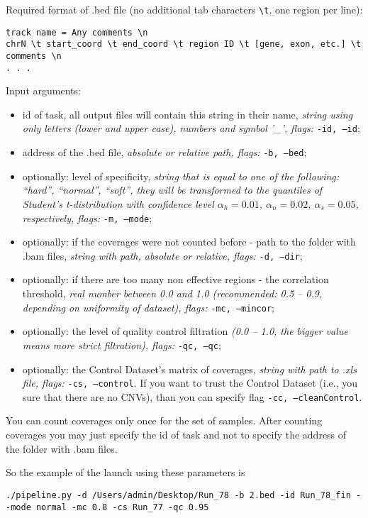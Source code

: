 \documentclass{article}
\begin{document}
Required format of .bed file (no additional tab characters \texttt{\textbackslash t}, one region per line):
\begin{lstlisting}[style=DOS]
track name = Any comments \n
chrN \t start_coord \t end_coord \t region ID \t [gene, exon, etc.] \t comments \n
. . .
\end{lstlisting}

\hfill \break
{\Large Input arguments:}
\begin{itemize}
\item id of task, all output files will contain this string in their name, {\it string using only letters (lower and
upper case), numbers and symbol '\_', flags:} \texttt{-id, --id};
\item address of the .bed file, {\it absolute or relative path, flags:} \texttt{-b, --bed};
\item optionally: level of specificity, {\it string that is equal to one of the following: ``hard'',
 ``normal'', ``soft'',
  they will be transformed to the 
  quantiles of Student's 
  t-distribution with confidence level $\alpha_h = 0.01$, $\alpha_n = 0.02$, $\alpha_s = 0.05$, respectively, flags:} \texttt{-m, --mode};
\item optionally: if the coverages were not counted before - path to the folder with .bam files, {\it string with
path, absolute or relative, flags: } \texttt{-d, --dir};
\item optionally: if there are too many non effective regions - the correlation threshold, {\it real number
between 0.0 and 1.0 (recommended: 0.5 -- 0.9, depending on uniformity of dataset), flags:} \texttt{-mc, --mincor};
\item optionally: the level of quality control filtration {\it(0.0 -- 1.0, the bigger value means more strict filtration), flags:} \texttt{-qc, --qc};
\item optionally: the Control Dataset's matrix of coverages, {\it string with path to .xls file, flags:} \texttt{-cs, --control}. If you want to trust the Control Dataset (i.e., you sure that there are no CNVs), than you can specify flag  \texttt{-cc, --cleanControl}.
\end{itemize}

You can count coverages only once for the set of samples. After counting coverages you may just specify the id of task and not to specify the address of the folder with .bam files.

So the example of the launch using these parameters is
\begin{lstlisting}[style=DOS, caption={Example of launch with all parameters specified}]
./pipeline.py -d /Users/admin/Desktop/Run_78 -b 2.bed -id Run_78_fin --mode normal -mc 0.8 -cs Run_77 -qc 0.95
\end{lstlisting}
\end{document}
